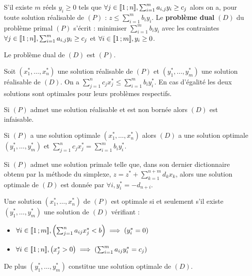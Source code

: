 S'il existe $m$ réels $y_i \geq 0$ tels que $\forall j \in \mathopen{[\![}1\mathclose{}\mathpunct{};n\mathclose{]\!]}, \sum_{i = 1}^m a_{i,j} y_i \geq c_j$ alors on a, pour toute solution réalisable de $(P)$ : $z \leq \sum_{i = 1}^m b_i y_i$.
Le \textbf{problème dual} $(D)$ du problème primal $(P)$ s'écrit : minimiser $\sum_{i = 1}^m b_i y_i$ avec les contraintes $\forall j \in \mathopen{[\![}1\mathclose{}\mathpunct{};n\mathclose{]\!]}, \sum_{i = 1}^m a_{i,j} y_i \geq c_j$ et $\forall i \in \mathopen{[\![}1\mathclose{}\mathpunct{};m\mathclose{]\!]}, y_i \geq 0$.

\begin{rem}
	Le problème dual de $(D)$ est $(P)$.
\end{rem}

\begin{pop}
	Soit $(x_1^*, \ldots, x_n^*)$ une solution réalisable de $(P)$ et $(y_1^*, \ldots, y_m^*)$ une solution réalisable de $(D)$.
	On a $\sum_{j = 1}^n c_j x_j^* \leq \sum_{i = 1}^m b_i y_i^*$.
	En cas d'égalité les deux solutions sont optimales pour leurs problèmes respectifs.
\end{pop}

\begin{cor}
	Si $(P)$ admet une solution réalisable et est non bornée alors $(D)$ est infaisable.
\end{cor}

\begin{thm}[de la dualité]
	Si $(P)$ a une solution optimale $(x_1^*, \ldots, x_n^*)$ alors $(D)$ a une solution optimale $(y_1^*, \ldots, y_m^*)$ et $\sum_{j = 1}^n c_j x_j^* = \sum_{i = 1}^m b_i y_i^*$.
\end{thm}

\begin{pop}
	Si $(P)$ admet une solution primale telle que, dans son dernier dictionnaire obtenu par la méthode du simplexe, $z = z^* + \sum_{k = 1}^{n + m} d_k x_k$, alors une solution optimale de $(D)$ est donnée par $\forall i, y_i^* = - d_{n + i}$.
\end{pop}

\begin{thm}
	Une solution $(x_1^*, \ldots, x_n^*)$ de $(P)$ est optimale si et seulement s'il existe $(y_1^*, \ldots, y_m^*)$ une solution de $(D)$ vérifiant :
	\begin{itemize}
		\item[\textbullet] $\forall i \in \mathopen{[\![}1\mathclose{}\mathpunct{};m\mathclose{]\!]}, \left( \sum_{j = 1}^n a_{ij} x_j^* < b \right) \implies \left( y_i^* = 0 \right)$
		\item[\textbullet] $\forall i \in \mathopen{[\![}1\mathclose{}\mathpunct{};n\mathclose{]\!]}, \left( x_j^* > 0 \right) \implies \left( \sum_{i = 1}^m a_{ij} y_i^* = c_j \right)$
	\end{itemize}
	De plus $(y_1^*, \ldots, y_m^*)$ constitue une solution optimale de $(D)$.
\end{thm}

